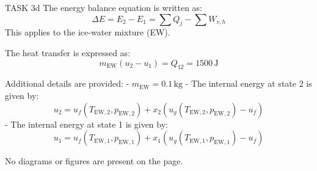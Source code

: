 TASK 3d  
The energy balance equation is written as:  
\[
\Delta E = E_2 - E_1 = \sum Q_j - \sum W_{v,h}
\]  
This applies to the ice-water mixture (EW).  

The heat transfer is expressed as:  
\[
m_{\text{EW}} (u_2 - u_1) = Q_{12} = 1500 \, \text{J}
\]  

Additional details are provided:  
- \( m_{\text{EW}} = 0.1 \, \text{kg} \)  
- The internal energy at state 2 is given by:  
\[
u_2 = u_f(T_{\text{EW},2}, p_{\text{EW},2}) + x_2 \left( u_g(T_{\text{EW},2}, p_{\text{EW},2}) - u_f \right)
\]  
- The internal energy at state 1 is given by:  
\[
u_1 = u_f(T_{\text{EW},1}, p_{\text{EW},1}) + x_1 \left( u_g(T_{\text{EW},1}, p_{\text{EW},1}) - u_f \right)
\]  

No diagrams or figures are present on the page.
